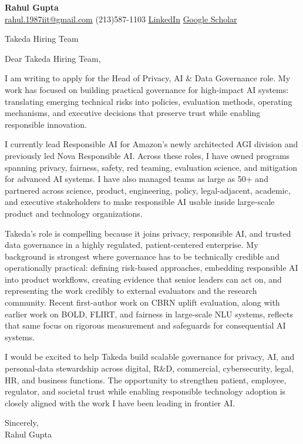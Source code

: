 \documentclass[11pt]{article}
\begin{document}
{\Large\bfseries Rahul Gupta}\\[2pt]
\href{mailto:rahul.1987iit@gmail.com}{rahul.1987iit@gmail.com} \quad
(213)587-1103 \quad
\href{https://www.linkedin.com/in/rahul-gupta-16139818}{LinkedIn} \quad
\href{https://scholar.google.com/citations?user=gSTLsFcAAAAJ}{Google Scholar}

\vspace{18pt}

Takeda Hiring Team

\vspace{8pt}

Dear Takeda Hiring Team,

I am writing to apply for the Head of Privacy, AI \& Data Governance role. My work has focused on building practical governance for high-impact AI systems: translating emerging technical risks into policies, evaluation methods, operating mechanisms, and executive decisions that preserve trust while enabling responsible innovation.

I currently lead Responsible AI for Amazon's newly architected AGI division and previously led Nova Responsible AI. Across these roles, I have owned programs spanning privacy, fairness, safety, red teaming, evaluation science, and mitigation for advanced AI systems. I have also managed teams as large as 50+ and partnered across science, product, engineering, policy, legal-adjacent, academic, and executive stakeholders to make responsible AI usable inside large-scale product and technology organizations.

Takeda's role is compelling because it joins privacy, responsible AI, and trusted data governance in a highly regulated, patient-centered enterprise. My background is strongest where governance has to be technically credible and operationally practical: defining risk-based approaches, embedding responsible AI into product workflows, creating evidence that senior leaders can act on, and representing the work credibly to external evaluators and the research community. Recent first-author work on CBRN uplift evaluation, along with earlier work on BOLD, FLIRT, and fairness in large-scale NLU systems, reflects that same focus on rigorous measurement and safeguards for consequential AI systems.

I would be excited to help Takeda build scalable governance for privacy, AI, and personal-data stewardship across digital, R\&D, commercial, cybersecurity, legal, HR, and business functions. The opportunity to strengthen patient, employee, regulator, and societal trust while enabling responsible technology adoption is closely aligned with the work I have been leading in frontier AI.

Sincerely,\\[18pt]
Rahul Gupta
\end{document}
